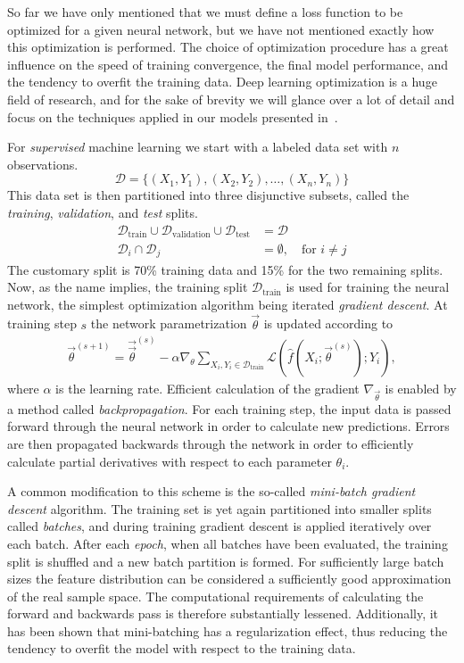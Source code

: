 So far we have only mentioned that we must define a loss function to be optimized for a given neural network, but we have not mentioned exactly how this optimization is performed.
The choice of optimization procedure has a great influence on the speed of training convergence, the final model performance, and the tendency to overfit the training data.
Deep learning optimization is a huge field of research, and for the sake of brevity we will glance over a lot of detail and focus on the techniques applied in our models presented in~.

For \textit{supervised} machine learning we start with a labeled data set with $n$ observations.
%
\begin{equation*}
  \mathcal{D} = \{(X_1, Y_1), (X_2, Y_2), \ldots, (X_n, Y_n)\}
\end{equation*}
%
This data set is then partitioned into three disjunctive subsets, called the \textit{training}, \textit{validation}, and \textit{test} splits.
%
\begin{align*}
  \mathcal{D}_{\mathrm{train}} \cup \mathcal{D}_{\mathrm{validation}} \cup \mathcal{D}_{\mathrm{test}} &= \mathcal{D}\\
  \mathcal{D}_i \cap \mathcal{D}_j &= \emptyset,~~~\text{ for } i \neq j
\end{align*}
%
The customary split is 70\% training data and 15\% for the two remaining splits.
Now, as the name implies, the training split $\mathcal{D}_{\mathrm{train}}$ is used for training the neural network, the simplest optimization algorithm being iterated \textit{gradient descent}.
At training step $s$ the network parametrization $\vec{\theta}$ is updated according to
%
\begin{align*}
  \vec{\theta}^{(s + 1)}
  =
    \vec{\vec{\theta}}^{(s)}
    -
    \alpha \nabla_{\theta}
      \sum_{X_i, Y_i \in \mathcal{D}_{\mathrm{train}}}
      \mathcal{L}(\hat{f}(X_i; \vec{\theta}^{(s)}); Y_i)
  ,
\end{align*}
%
where $\alpha$ is the learning rate.
Efficient calculation of the gradient $\nabla_{\vec{\theta}}$ is enabled by a method called \textit{backpropagation}.
For each training step, the input data is passed forward through the neural network in order to calculate new predictions.
Errors are then propagated backwards through the network in order to efficiently calculate partial derivatives with respect to each parameter $\theta_i$.

A common modification to this scheme is the so-called \textit{mini-batch gradient descent} algorithm.
The training set is yet again partitioned into smaller splits called \textit{batches}, and during training gradient descent is applied iteratively over each batch.
After each \textit{epoch}, when all batches have been evaluated, the training split is shuffled and a new batch partition is formed.
For sufficiently large batch sizes the feature distribution can be considered a sufficiently good approximation of the real sample space.
The computational requirements of calculating the forward and backwards pass is therefore substantially lessened.
Additionally, it has been shown that mini-batching has a regularization effect, thus reducing the tendency to overfit the model with respect to the training data.

